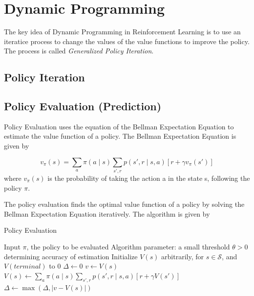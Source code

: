 \section{Dynamic Programming}

The key idea of Dynamic Programming in Reinforcement Learning is to use an iteratice process to change the values of the value functions to improve the policy. The process is called \textit{Generalized Policy Iteration}.

\subsection{Policy Iteration}

\subsection{Policy Evaluation (Prediction)}

Policy Evaluation uses the equation of the Bellman Expectation Equation to estimate the value function of a policy. The Bellman Expectation Equation is given by

\begin{equation}
    v_\pi(s) = \sum_a \pi(a\mid s)\sum_{s',r}p(s',r\mid s,a)\left[r + \gamma v_\pi(s')\right]
\end{equation}where $v_\pi(s)$ is the probability of taking the action a in the state s, following the policy $\pi$.

The policy evaluation finds the optimal value function of a policy by solving the Bellman Expectation Equation iteratively. The algorithm is given by

\begin{algorithm}[H]
    \caption{Policy Evaluation}
    \begin{algorithmic}[1]
        \State Input $\pi$, the policy to be evaluated
        \State Algorithm parameter: a small threshold $\theta>0$ determining accuracy of estimation
        \State Initialize $V(s)$ arbitrarily, for $s\in\mathcal{S}$, and $V(terminal)$ to $0$
        \Repeat
            \State $\Delta \leftarrow 0$
                \State $v \leftarrow V(s)$
                \State $V(s) \leftarrow \sum_a \pi(a\mid s)\sum_{s',r}p(s',r\mid s,a)\left[r + \gamma V(s')\right]$
                \State $\Delta \leftarrow \max(\Delta, |v-V(s)|)$
            \EndFor
        \Until{$\Delta < \theta$}
    \end{algorithmic}
\end{algorithm}

